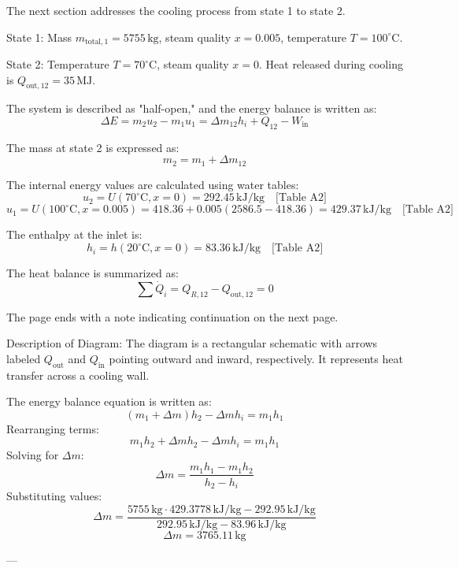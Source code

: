 The next section addresses the cooling process from state 1 to state 2.  

State 1:  
Mass \( m_{\text{total},1} = 5755 \, \text{kg} \), steam quality \( x = 0.005 \), temperature \( T = 100^\circ\text{C} \).  

State 2:  
Temperature \( T = 70^\circ\text{C} \), steam quality \( x = 0 \). Heat released during cooling is \( Q_{\text{out},12} = 35 \, \text{MJ} \).  

The system is described as "half-open," and the energy balance is written as:  
\[
\Delta E = m_2 u_2 - m_1 u_1 = \Delta m_{12} h_i + Q_{12} - W_{\text{in}}
\]  

The mass at state 2 is expressed as:  
\[
m_2 = m_1 + \Delta m_{12}
\]  

The internal energy values are calculated using water tables:  
\[
u_2 = U(70^\circ\text{C}, x = 0) = 292.45 \, \text{kJ/kg} \quad \text{[Table A2]}
\]  
\[
u_1 = U(100^\circ\text{C}, x = 0.005) = 418.36 + 0.005 (2586.5 - 418.36) = 429.37 \, \text{kJ/kg} \quad \text{[Table A2]}
\]  

The enthalpy at the inlet is:  
\[
h_i = h(20^\circ\text{C}, x = 0) = 83.36 \, \text{kJ/kg} \quad \text{[Table A2]}
\]  

The heat balance is summarized as:  
\[
\sum \dot{Q}_i = Q_{R,12} - Q_{\text{out},12} = 0
\]  

The page ends with a note indicating continuation on the next page.  

Description of Diagram:  
The diagram is a rectangular schematic with arrows labeled \( Q_{\text{out}} \) and \( Q_{\text{in}} \) pointing outward and inward, respectively. It represents heat transfer across a cooling wall.

The energy balance equation is written as:  
\[
(m_1 + \Delta m) h_2 - \Delta m h_i = m_1 h_1
\]  
Rearranging terms:  
\[
m_1 h_2 + \Delta m h_2 - \Delta m h_i = m_1 h_1
\]  
Solving for \( \Delta m \):  
\[
\Delta m = \frac{m_1 h_1 - m_1 h_2}{h_2 - h_i}
\]  
Substituting values:  
\[
\Delta m = \frac{5755 \, \text{kg} \cdot 429.3778 \, \text{kJ/kg} - 292.95 \, \text{kJ/kg}}{292.95 \, \text{kJ/kg} - 83.96 \, \text{kJ/kg}}
\]  
\[
\Delta m = 3765.11 \, \text{kg}
\]  

---
